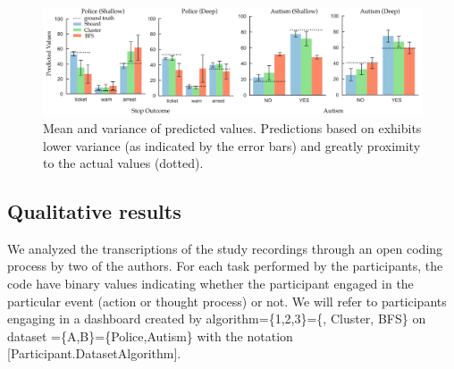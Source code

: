 \begin{figure}[bht]
\centering
\includegraphics[width=\linewidth]{figures/Prediction_Actual.png}
\caption{Mean and variance of predicted values. Predictions based on \system exhibits lower variance (as indicated by the error bars) and greatly proximity to the actual values (dotted).}
\label{fig:actual_predictions}
\end{figure}
\subsection{Qualitative results}
We analyzed the transcriptions of the study recordings through an open coding process by two of the authors. For each task performed by the participants, the code have binary values indicating whether the participant engaged in the particular event (action or thought process) or not. We will refer to participants engaging in a dashboard created by algorithm=\{1,2,3\}=\{\system, Cluster, BFS\} on dataset =\{A,B\}=\{Police,Autism\} with the notation [Participant.DatasetAlgorithm].


